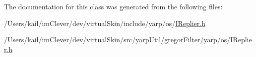 The documentation for this class was generated from the following files:\begin{DoxyCompactItemize}
\item 
/Users/kail/imClever/dev/virtualSkin/include/yarp/os/\hyperlink{include_2yarp_2os_2_i_replier_8h}{IReplier.h}\item 
/Users/kail/imClever/dev/virtualSkin/src/yarpUtil/gregorFilter/yarp/os/\hyperlink{src_2yarp_util_2gregor_filter_2yarp_2os_2_i_replier_8h}{IReplier.h}\end{DoxyCompactItemize}
